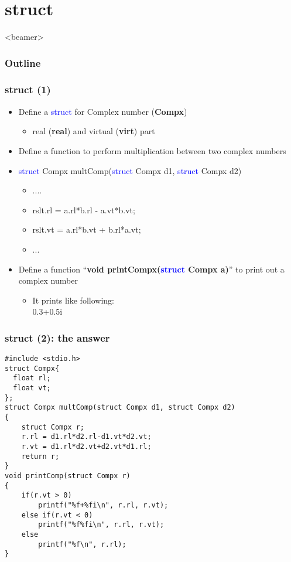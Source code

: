 \section{struct}
\label{sec:strt}
\begin{frame}<beamer>
    \frametitle{Outline}
    \tableofcontents[currentsection]
\end{frame}

\begin{frame}
\frametitle{struct (1)}
\begin{itemize}
	\item {Define a \textcolor{blue}{struct} for Complex number (\textbf{Compx})}
		\begin{itemize}
			\item {real (\textbf{real}) and virtual (\textbf{virt}) part}
		\end{itemize}
	\item {Define a function to perform multiplication between two complex numbers}
	\item {\textcolor{blue}{struct} Compx multComp(\textcolor{blue}{struct} Compx d1, \textcolor{blue}{struct} Compx d2)}
		\begin{itemize}
		    \item {....}
			\item {rslt.rl = a.rl*b.rl - a.vt*b.vt;}
			\item {rslt.vt = a.rl*b.vt + b.rl*a.vt;}
			\item {...}
		\end{itemize}
	\item {Define a function ``\textbf{void printCompx(\textcolor{blue}{struct} Compx a)}'' to print out a complex number}
	\begin{itemize}
		\item {It prints like following:\\}
		0.3+0.5i
	\end{itemize}
	
\end{itemize}

\end{frame}

\ifx\answers\undefined
\begin{frame}[fragile]
\frametitle{struct (2): the answer}
\vspace{-0.15in}
\begin{lstlisting}[xleftmargin=0.05\linewidth, linewidth=0.96\linewidth]
#include <stdio.h>
struct Compx{
  float rl;
  float vt;
};
struct Compx multComp(struct Compx d1, struct Compx d2)
{
	struct Compx r;
	r.rl = d1.rl*d2.rl-d1.vt*d2.vt;
	r.vt = d1.rl*d2.vt+d2.vt*d1.rl;
	return r;
}
void printComp(struct Compx r)
{
	if(r.vt > 0)
    	printf("%f+%fi\n", r.rl, r.vt);
    else if(r.vt < 0)
    	printf("%f%fi\n", r.rl, r.vt);
    else
        printf("%f\n", r.rl);
}
\end{lstlisting}
\end{frame}
\fi

